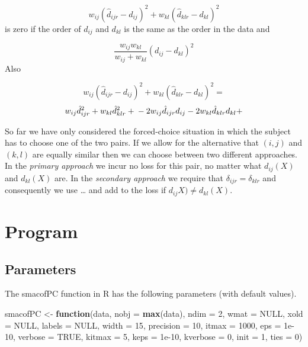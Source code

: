 \documentclass[
  12pt,
]{article}
\newenvironment{Shaded}{\begin{snugshade}}{\end{snugshade}}
\newcommand{\AttributeTok}[1]{\textcolor[rgb]{0.13,0.29,0.53}{#1}}
\newcommand{\ConstantTok}[1]{\textcolor[rgb]{0.56,0.35,0.01}{#1}}
\newcommand{\ControlFlowTok}[1]{\textcolor[rgb]{0.13,0.29,0.53}{\textbf{#1}}}
\newcommand{\DecValTok}[1]{\textcolor[rgb]{0.00,0.00,0.81}{#1}}
\newcommand{\FloatTok}[1]{\textcolor[rgb]{0.00,0.00,0.81}{#1}}
\newcommand{\FunctionTok}[1]{\textcolor[rgb]{0.13,0.29,0.53}{\textbf{#1}}}
\newcommand{\NormalTok}[1]{#1}
\newcommand{\OtherTok}[1]{\textcolor[rgb]{0.56,0.35,0.01}{#1}}
\begin{document}
\[w_{ij}(\hat d_{ijr}-d_{ij})^2+w_{kl}(\hat d_{klr}-d_{kl})^2\]
is zero if the order of \(d_{ij}\) and \(d_{kl}\) is the same as the order in the data
and

\[
\frac{w_{ij}w_{kl}}{w_{ij}+w_{kl}}(d_{ij}-d_{kl})^2
\]
Also

\[w_{ij}(\hat d_{ijr}-d_{ij})^2+w_{kl}(\hat d_{klr}-d_{kl})^2=\]
\[
w_{ij}\hat d_{ijr}^2+w_{kl}\hat d_{klr}^2+\\
-2w_{ij}\hat d_{ijr}d_{ij}-2w_{kl}\hat d_{klr}d_{kl}+
\]

So far we have only considered the forced-choice situation in which
the subject has to choose one of the two pairs. If we allow for the alternative that \((i,j)\) and \((k,l)\) are equally similar then we can choose between two different approaches. In the \emph{primary approach} we incur no loss for this pair, no matter what \(d_{ij}(X)\) and \(d_{kl}(X)\) are. In the \emph{secondary approach} we require that \(\delta_{ijr}=\delta_{klr}\) and consequently we use \ldots{} and add to the loss if
\(d_{ij}X)\not= d_{kl}(X)\).

\section{Program}\label{program}

\subsection{Parameters}\label{parameters}

The smacofPC function in R has the following parameters (with default values).

\begin{Shaded}
\begin{Highlighting}[]
\NormalTok{smacofPC }\OtherTok{\textless{}{-}} \ControlFlowTok{function}\NormalTok{(data,}
                     \AttributeTok{nobj =} \FunctionTok{max}\NormalTok{(data),}
                     \AttributeTok{ndim =} \DecValTok{2}\NormalTok{,}
                     \AttributeTok{wmat =} \ConstantTok{NULL}\NormalTok{,}
                     \AttributeTok{xold =} \ConstantTok{NULL}\NormalTok{,}
                     \AttributeTok{labels =} \ConstantTok{NULL}\NormalTok{,}
                     \AttributeTok{width =} \DecValTok{15}\NormalTok{,}
                     \AttributeTok{precision =} \DecValTok{10}\NormalTok{,}
                     \AttributeTok{itmax =} \DecValTok{1000}\NormalTok{,}
                     \AttributeTok{eps =} \FloatTok{1e{-}10}\NormalTok{,}
                     \AttributeTok{verbose =} \ConstantTok{TRUE}\NormalTok{,}
                     \AttributeTok{kitmax =} \DecValTok{5}\NormalTok{,}
                     \AttributeTok{keps =} \FloatTok{1e{-}10}\NormalTok{,}
                     \AttributeTok{kverbose =} \DecValTok{0}\NormalTok{,}
                     \AttributeTok{init =} \DecValTok{1}\NormalTok{,}
                     \AttributeTok{ties =} \DecValTok{0}\NormalTok{)}
\end{Highlighting}
\end{Shaded}
\end{document}
